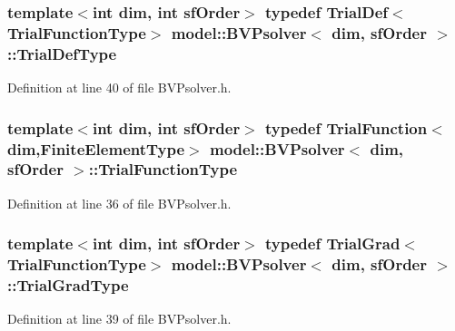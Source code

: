 \subsubsection[{Trial\+Def\+Type}]{\setlength{\rightskip}{0pt plus 5cm}template$<$int dim, int sf\+Order$>$ typedef {\bf Trial\+Def}$<${\bf Trial\+Function\+Type}$>$ {\bf model\+::\+B\+V\+Psolver}$<$ {\bf dim}, sf\+Order $>$\+::{\bf Trial\+Def\+Type}}\label{classmodel_1_1_b_v_psolver_aa514066cc07fb36e5f66dcc384b81309}


Definition at line 40 of file B\+V\+Psolver.\+h.

\hypertarget{classmodel_1_1_b_v_psolver_a931b55260404ec986f534d8aafc20a68}{}
\subsubsection[{Trial\+Function\+Type}]{\setlength{\rightskip}{0pt plus 5cm}template$<$int dim, int sf\+Order$>$ typedef {\bf Trial\+Function}$<${\bf dim},{\bf Finite\+Element\+Type}$>$ {\bf model\+::\+B\+V\+Psolver}$<$ {\bf dim}, sf\+Order $>$\+::{\bf Trial\+Function\+Type}}\label{classmodel_1_1_b_v_psolver_a931b55260404ec986f534d8aafc20a68}


Definition at line 36 of file B\+V\+Psolver.\+h.

\hypertarget{classmodel_1_1_b_v_psolver_afbb1489d0aef7b6b1057f0473801bfaf}{}
\subsubsection[{Trial\+Grad\+Type}]{\setlength{\rightskip}{0pt plus 5cm}template$<$int dim, int sf\+Order$>$ typedef {\bf Trial\+Grad}$<${\bf Trial\+Function\+Type}$>$ {\bf model\+::\+B\+V\+Psolver}$<$ {\bf dim}, sf\+Order $>$\+::{\bf Trial\+Grad\+Type}}\label{classmodel_1_1_b_v_psolver_afbb1489d0aef7b6b1057f0473801bfaf}


Definition at line 39 of file B\+V\+Psolver.\+h.

\hypertarget{classmodel_1_1_b_v_psolver_a6bc66eb0f47862bcb00b530cf9b85601}{}
